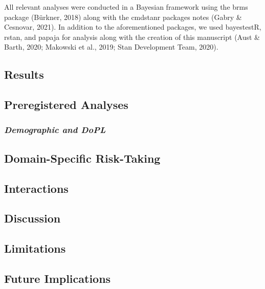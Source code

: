 \documentclass[
  donotrepeattitle,doc, 12pt, a4paper,floatsintext]{apa7}
\begin{document}
All relevant analyses were conducted in a Bayesian framework using the brms package (Bürkner, 2018) along with the cmdstanr packages notes (Gabry \& Cesnovar, 2021). In addition to the aforementioned packages, we used bayestestR, rstan, and papaja for analysis along with the creation of this manuscript (Aust \& Barth, 2020; Makowski et al., 2019; Stan Development Team, 2020).

\hypertarget{results}{%
\subsection{Results}\label{results}}

\hypertarget{preregistered-analyses}{%
\subsection{Preregistered Analyses}\label{preregistered-analyses}}

\hypertarget{demographic-and-dopl}{%
\subsubsection{\texorpdfstring{\emph{Demographic and DoPL}}{Demographic and DoPL}}\label{demographic-and-dopl}}

\hypertarget{domain-specific-risk-taking}{%
\subsection{Domain-Specific Risk-Taking}\label{domain-specific-risk-taking}}

\hypertarget{interactions}{%
\subsection{Interactions}\label{interactions}}

\hypertarget{discussion}{%
\subsection{Discussion}\label{discussion}}

\hypertarget{limitations}{%
\subsection{Limitations}\label{limitations}}

\hypertarget{future-implications}{%
\subsection{Future Implications}\label{future-implications}}
\end{document}
